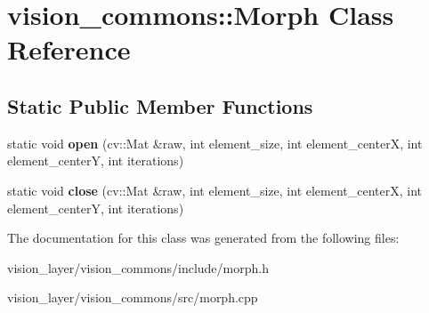 \hypertarget{classvision__commons_1_1Morph}{}\section{vision\+\_\+commons\+:\+:Morph Class Reference}
\label{classvision__commons_1_1Morph}
\subsection*{Static Public Member Functions}
\begin{DoxyCompactItemize}
\item 
\mbox{\label{classvision__commons_1_1Morph_a84d97e31e9ed1c16527fc23679811a8c}} 
static void {\bfseries open} (cv\+::\+Mat \&raw, int element\+\_\+size, int element\+\_\+centerX, int element\+\_\+centerY, int iterations)
\item 
\mbox{\label{classvision__commons_1_1Morph_a7eedf10d8eea01b258630e0992c98275}} 
static void {\bfseries close} (cv\+::\+Mat \&raw, int element\+\_\+size, int element\+\_\+centerX, int element\+\_\+centerY, int iterations)
\end{DoxyCompactItemize}


The documentation for this class was generated from the following files\+:\begin{DoxyCompactItemize}
\item 
vision\+\_\+layer/vision\+\_\+commons/include/morph.\+h\item 
vision\+\_\+layer/vision\+\_\+commons/src/morph.\+cpp\end{DoxyCompactItemize}
